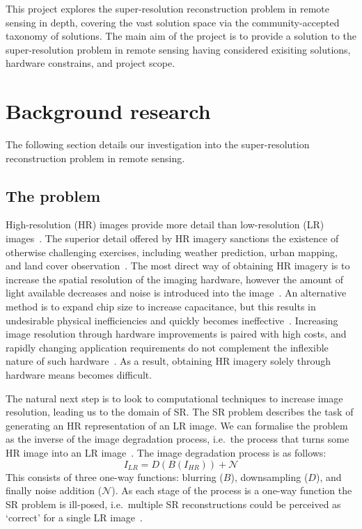 This project explores the super-resolution reconstruction problem in remote sensing in depth, covering the vast solution space via the community-accepted taxonomy of solutions. The main aim of the project is to provide a solution to the super-resolution problem in remote sensing having considered exisiting solutions, hardware constrains, and project scope.
\clearpage
\section{Background research}\label{sec:background_research}
The following section details our investigation into the super-resolution reconstruction problem in remote sensing.

\subsection{The problem}\label{subsec:the_problem}
High-resolution (HR) images provide more detail than low-resolution (LR) images~\cite{urbanMapping}. The superior detail offered by HR imagery sanctions the existence of otherwise challenging exercises, including weather prediction, urban mapping, and land cover observation~\cite{urbanMapping, mapping, cloudCover, vegetationMapping}. The most direct way of obtaining HR imagery is to increase the spatial resolution of the imaging hardware, however the amount of light available decreases and noise is introduced into the image~\cite{superResOverview}. An alternative method is to expand chip size to increase capacitance, but this results in undesirable physical inefficiencies and quickly becomes ineffective~\cite{superResOverview}. Increasing image resolution through hardware improvements is paired with high costs, and rapidly changing application requirements do not complement the inflexible nature of such hardware~\cite{remoteSensingGANsReview}. As a result, obtaining HR imagery solely through hardware means becomes difficult.

The natural next step is to look to computational techniques to increase image resolution, leading us to the domain of SR. The SR problem describes the task of generating an HR representation of an LR image. We can formalise the problem as the inverse of the image degradation process, i.e.\ the process that turns some HR image into an LR image~\cite{imageDeg}. The image degradation process is as follows:
\begin{equation}\label{eq:image_deg}
    I_{LR} = D(B(I_{HR})) + \mathcal{N}
\end{equation}
This consists of three one-way functions: blurring ($B$), downsampling ($D$), and finally noise addition ($\mathcal{N}$). As each stage of the process is a one-way function the SR problem is ill-posed, i.e.\ multiple SR reconstructions could be perceived as `correct' for a single LR image~\cite{remoteSensingDeepLearningReview}.

